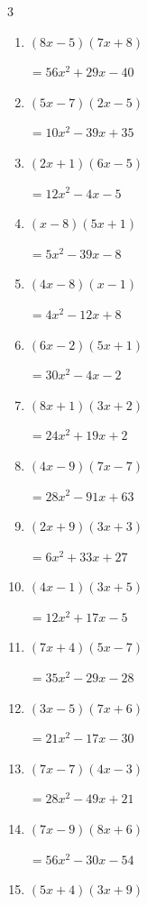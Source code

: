 \begin{multicols}{3}
\begin{enumerate}
        $=6x^{2}-15x-21$

\columnbreak %

\resetques

  \item $(8x-5)(7x+8)$

        $=56x^{2}+29x-40$

  \item $(5x-7)(2x-5)$

        $=10x^{2}-39x+35$

  \item $(2x+1)(6x-5)$

        $=12x^{2}-4x-5$

  \item $(x-8)(5x+1)$

        $=5x^{2}-39x-8$

  \item $(4x-8)(x-1)$

        $=4x^{2}-12x+8$

  \item $(6x-2)(5x+1)$

        $=30x^{2}-4x-2$

  \item $(8x+1)(3x+2)$

        $=24x^{2}+19x+2$

  \item $(4x-9)(7x-7)$

        $=28x^{2}-91x+63$

  \item $(2x+9)(3x+3)$

        $=6x^{2}+33x+27$

  \item $(4x-1)(3x+5)$

        $=12x^{2}+17x-5$

  \item $(7x+4)(5x-7)$

        $=35x^{2}-29x-28$

  \item $(3x-5)(7x+6)$

        $=21x^{2}-17x-30$

  \item $(7x-7)(4x-3)$

        $=28x^{2}-49x+21$

  \item $(7x-9)(8x+6)$

        $=56x^{2}-30x-54$

  \item $(5x+4)(3x+9)$


\end{enumerate}
\end{multicols}
